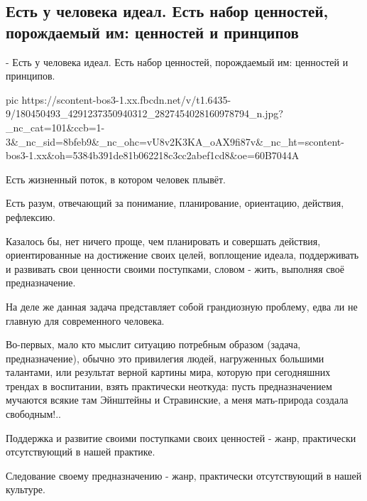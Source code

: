  
 
 
 
 
\subsection{Есть у человека идеал. Есть набор ценностей, порождаемый им: ценностей и принципов}
\label{sec:03_05_2021.fb.arestovich_aleksei.1.chelovek}

- Есть у человека идеал. Есть набор ценностей, порождаемый им: ценностей и принципов.

\ifcmt
  pic https://scontent-bos3-1.xx.fbcdn.net/v/t1.6435-9/180450493_4291237350940312_2827454028160978794_n.jpg?_nc_cat=101&ccb=1-3&_nc_sid=8bfeb9&_nc_ohc=vU8v2K3KA_oAX9fi87v&_nc_ht=scontent-bos3-1.xx&oh=5384b391de81b062218c3cc2abef1cd8&oe=60B7044A
\fi

Есть жизненный поток, в котором человек плывёт. 

Есть разум, отвечающий за понимание, планирование, ориентацию, действия,
рефлексию.

Казалось бы, нет ничего проще, чем планировать и совершать действия,
ориентированные на достижение своих целей, воплощение идеала, поддерживать и
развивать свои ценности своими поступками, словом - жить, выполняя своё
предназначение.

На деле же данная задача представляет собой грандиозную проблему, едва ли не
главную для современного человека.

Во-первых, мало кто мыслит ситуацию потребным образом (задача, предназначение),
обычно это привилегия людей, нагруженных большими талантами, или результат
верной картины мира, которую при сегодняшних трендах в воспитании, взять
практически неоткуда: пусть предназначением мучаются всякие там Эйнштейны и
Стравинские, а меня мать-природа создала свободным!..

Поддержка и развитие своими поступками своих ценностей - жанр, практически
отсутствующий в нашей практике. 

Следование своему предназначению - жанр, практически отсутствующий в нашей
культуре.

